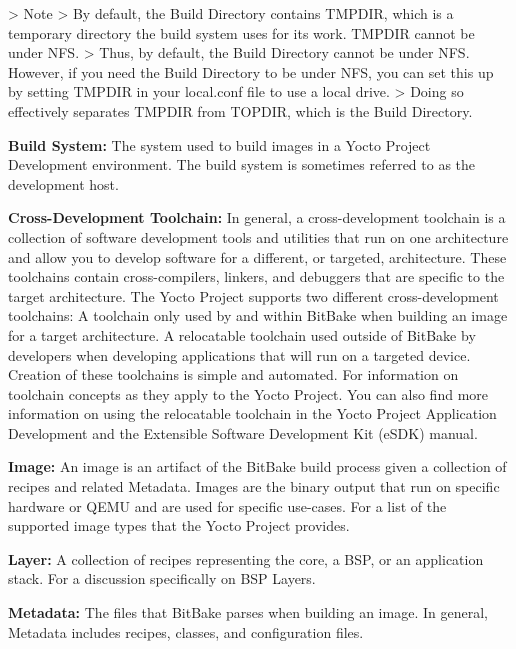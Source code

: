 \begin{DoxyItemize}
\begin{DoxyVerb}
>   Note
>   By default, the Build Directory contains TMPDIR, which is a temporary directory the build system uses for its work. TMPDIR cannot be under NFS. 
>   Thus, by default, the Build Directory cannot be under NFS. However, if you need the Build Directory to be under NFS, you can set this up by setting TMPDIR in your local.conf file to use a local drive. 
>   Doing so effectively separates TMPDIR from TOPDIR, which is the Build Directory. 
\end{DoxyVerb}

\item {\bfseries Build System\+:} The system used to build images in a Yocto Project Development environment. The build system is sometimes referred to as the development host.
\item {\bfseries Cross-\/\+Development Toolchain\+:} In general, a cross-\/development toolchain is a collection of software development tools and utilities that run on one architecture and allow you to develop software for a different, or targeted, architecture. These toolchains contain cross-\/compilers, linkers, and debuggers that are specific to the target architecture. The Yocto Project supports two different cross-\/development toolchains\+: A toolchain only used by and within Bit\+Bake when building an image for a target architecture. A relocatable toolchain used outside of Bit\+Bake by developers when developing applications that will run on a targeted device. Creation of these toolchains is simple and automated. For information on toolchain concepts as they apply to the Yocto Project. You can also find more information on using the relocatable toolchain in the Yocto Project Application Development and the Extensible Software Development Kit (e\+S\+DK) manual.
\item {\bfseries Image\+:} An image is an artifact of the Bit\+Bake build process given a collection of recipes and related Metadata. Images are the binary output that run on specific hardware or Q\+E\+MU and are used for specific use-\/cases. For a list of the supported image types that the Yocto Project provides.
\item {\bfseries Layer\+:} A collection of recipes representing the core, a B\+SP, or an application stack. For a discussion specifically on B\+SP Layers.
\item {\bfseries Metadata\+:} The files that Bit\+Bake parses when building an image. In general, Metadata includes recipes, classes, and configuration files.
\begin{DoxyItemize}

\end{DoxyItemize}
\end{DoxyItemize}
